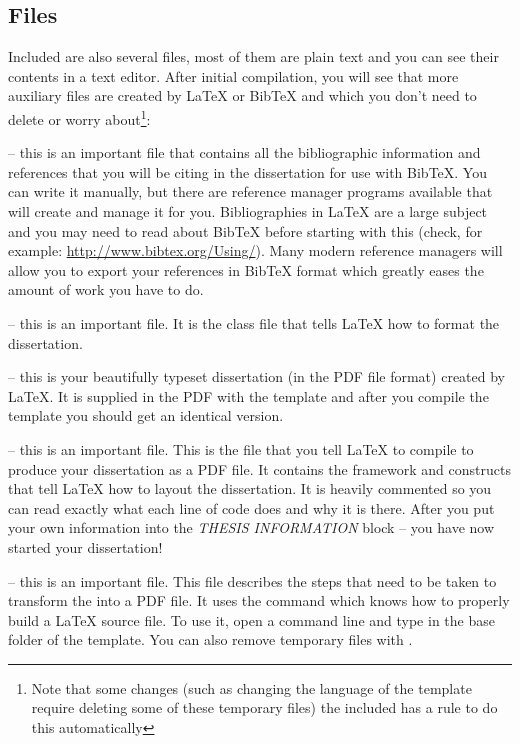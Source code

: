 \subsection{Files}

Included are also several files, most of them are plain text and you can see their contents in a text editor. After initial compilation, you will see that more auxiliary files are created by \LaTeX{} or BibTeX and which you don't need to delete or worry about\footnote{Note that some changes (such as changing the language of the template require deleting some of these temporary files) the included  has a  rule to do this automatically}:

 -- this is an important file that contains all the bibliographic information and references that you will be citing in the dissertation for use with BibTeX. You can write it manually, but there are reference manager programs available that will create and manage it for you. Bibliographies in \LaTeX{} are a large subject and you may need to read about BibTeX before starting with this (check, for example: \url{http://www.bibtex.org/Using/}). Many modern reference managers will allow you to export your references in BibTeX format which greatly eases the amount of work you have to do.

 -- this is an important file. It is the class file that tells \LaTeX{} how to format the dissertation. 

 -- this is your beautifully typeset dissertation (in the PDF file format) created by \LaTeX{}. It is supplied in the PDF with the template and after you compile the template you should get an identical version.

 -- this is an important file. This is the file that you tell \LaTeX{} to compile to produce your dissertation as a PDF file. It contains the framework and constructs that tell \LaTeX{} how to layout the dissertation. It is heavily commented so you can read exactly what each line of code does and why it is there. After you put your own information into the \emph{THESIS INFORMATION} block -- you have now started your dissertation!

 -- this is an important file. This file describes the steps that need to be taken to transform the  into a PDF file. It uses the command  which knows how to properly build a \LaTeX{} source file. To use it, open a command line and type  in the base folder of the template. You can also remove temporary files with . 

